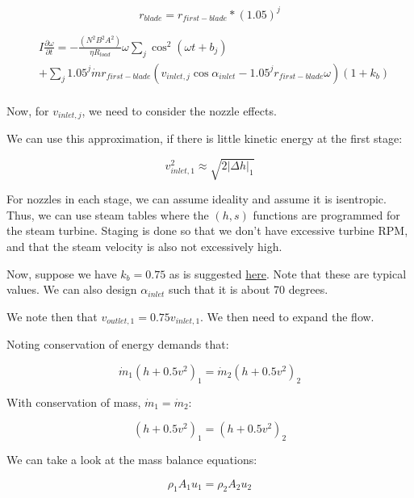 \documentclass[masters]{ucbthesis}
\renewcommand{\_}{\kern-1.5pt\textunderscore\kern-1.5pt}
\begin{document}
\begin{equation*}
	r_{blade} = r_{first-blade} * (1.05)^j
\end{equation*}

\begin{align*}
	& I \frac{\partial  \omega}{\partial t} = 
	- \frac{( N^2 B^2 A^2 )}{\eta R_{load} }\omega 
	\sum_j \cos^2 (\omega t + b_j)  \\ &
	+ 
	\sum_j 1.05^j \dot{m}  r_{first-blade} 
	(v_{inlet,j} \cos \alpha_{inlet} - 1.05^j r_{first-blade}  \omega) (1+ k_b)
	\\
\end{align*}

Now, for $v_{inlet,j}$, we need to consider the nozzle effects.

We can use this approximation, if there is little kinetic energy 
at the first stage:

\begin{equation*}
	v_{inlet,1}^2 \approx \sqrt{2 |\Delta h|_1}
\end{equation*}

For nozzles in each stage, we can assume 
ideality and assume it is isentropic. Thus, 
we can use steam tables where the $(h,s)$ functions are programmed for the 
steam turbine.
Staging is done so that we don't have excessive turbine RPM, and that 
the steam velocity is also not excessively high.

Now, suppose we have $k_b = 0.75$ as is suggested
\href{https://www.rcet.org.in/uploads/academics/rohini_87406374493.pdf}{here}.
Note that these are typical values.
We can also design $\alpha_{inlet}$ such that it is about 70 degrees.

We note then that $v_{outlet,1} = 0.75 v_{inlet,1}$.
We then need to expand the flow.

Noting conservation of energy demands that:

\begin{equation*}
	\dot{m}_1 \left( h + 0.5 v^2 \right)_1 = 
	\dot{m}_2 \left( h + 0.5 v^2 \right)_2
\end{equation*}

With conservation of mass, $\dot{m}_1 = \dot{m}_2$:

\begin{equation*}
	\left( h + 0.5 v^2 \right)_1 = \left( h + 0.5 v^2 \right)_2
\end{equation*}

We can take a look at the mass balance equations:

\begin{equation*}
	\rho_1 A_1 u_1 = \rho_2 A_2 u_2
\end{equation*}
\end{document}
